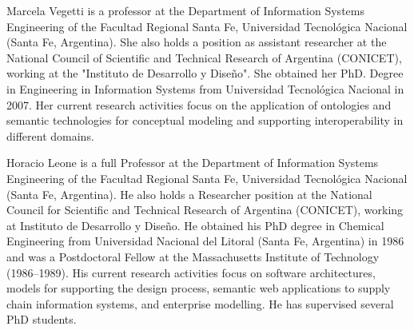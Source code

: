 \documentclass[journal]{IEEEtran}
\begin{document}
\begin{IEEEbiography}{Marcela Vegetti}
 is a professor at the Department of Information Systems Engineering of the Facultad Regional Santa Fe, Universidad Tecnológica Nacional (Santa Fe, Argentina). She also holds a position as assistant researcher at the National Council of Scientific and Technical Research of Argentina (CONICET), working at the "Instituto de Desarrollo y Diseño". She obtained her PhD. Degree in Engineering in Information Systems from Universidad Tecnológica Nacional in 2007. Her current research activities focus on the application of ontologies and semantic technologies for conceptual modeling and supporting interoperability in different domains.
\end{IEEEbiography}


\begin{IEEEbiography}{Horacio Leone}
is a full Professor at the Department of Information Systems Engineering of the Facultad Regional Santa Fe, Universidad Tecnológica Nacional (Santa Fe, Argentina). He also holds a Researcher position at the National Council for Scientific and Technical Research of Argentina (CONICET), working at Instituto de Desarrollo y Diseño. He obtained his PhD degree in Chemical Engineering from Universidad Nacional del Litoral (Santa Fe, Argentina) in 1986 and was a Postdoctoral Fellow at the Massachusetts Institute of Technology (1986–1989). His current research activities focus on software architectures, models for supporting the design process, semantic web applications to supply chain information systems, and enterprise modelling. He has supervised several PhD students.
\end{IEEEbiography}






\end{document}
